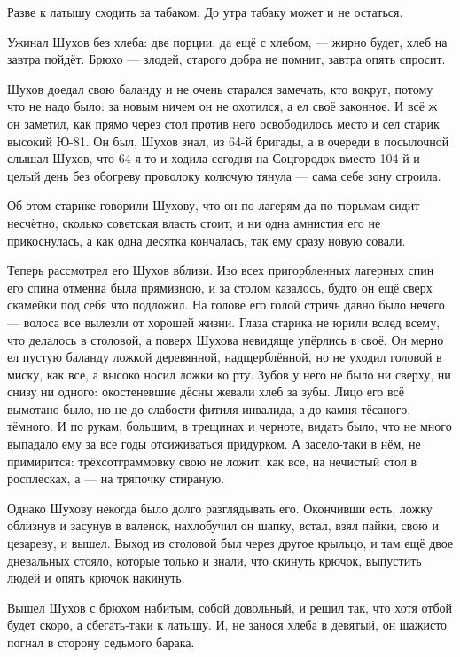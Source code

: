 Разве к латышу сходить за табаком. До утра табаку может и не остаться.

Ужинал Шухов без хлеба: две порции, да ещё с хлебом, --- жирно будет, хлеб на завтра пойдёт.
Брюхо --- злодей, старого добра не помнит, завтра опять спросит.

Шухов доедал свою баланду и не очень старался замечать, кто вокруг, потому что не надо было:
за новым ничем он не охотился, а ел своё законное. И всё ж он заметил, как прямо через стол
против него освободилось место и сел старик высокий Ю-81. Он был, Шухов знал, из 64-й бригады, а в
очереди в посылочной слышал Шухов, что 64-я-то и ходила сегодня на Соцгородок вместо 104-й и
целый день без обогреву проволоку колючую тянула --- сама себе зону строила.

Об этом старике говорили Шухову, что он по лагерям да по тюрьмам сидит несчётно, сколько
советская власть стоит, и ни одна амнистия его не прикоснулась, а как одна десятка кончалась,
так ему сразу новую совали.

Теперь рассмотрел его Шухов вблизи. Изо всех пригорбленных лагерных спин его спина отменна
была прямизною, и за столом казалось, будто он ещё сверх скамейки под себя что подложил. На
голове его голой стричь давно было нечего --- волоса все вылезли от хорошей жизни. Глаза
старика не юрили вслед всему, что делалось в столовой, а поверх Шухова невидяще упёрлись в
своё. Он мерно ел пустую баланду ложкой деревянной, надщерблённой, но не уходил головой в
миску, как все, а высоко носил ложки ко рту. Зубов у него не было ни сверху, ни снизу ни одного:
окостеневшие дёсны жевали хлеб за зубы. Лицо его всё вымотано было, но не до слабости
фитиля-инвалида, а до камня тёсаного, тёмного. И по рукам, большим, в трещинах и черноте,
видать было, что не много выпадало ему за все годы отсиживаться придурком. А засело-таки в
нём, не примирится: трёхсотграммовку свою не ложит, как все, на нечистый стол в росплесках, а
--- на тряпочку стираную.

Однако Шухову некогда было долго разглядывать его. Окончивши есть, ложку облизнув и засунув
в валенок, нахлобучил он шапку, встал, взял пайки, свою и цезареву, и вышел. Выход из столовой
был через другое крыльцо, и там ещё двое дневальных стояло, которые только и знали, что
скинуть крючок, выпустить людей и опять крючок накинуть.

Вышел Шухов с брюхом набитым, собой довольный, и решил так, что хотя отбой будет скоро, а
сбегать-таки к латышу. И, не занося хлеба в девятый, он шажисто погнал в сторону седьмого
барака.

